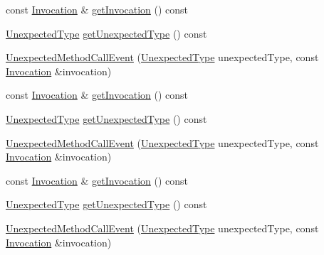 \begin{DoxyCompactItemize}
\item 
const \mbox{\hyperlink{structfakeit_1_1Invocation}{Invocation}} \& \mbox{\hyperlink{structfakeit_1_1UnexpectedMethodCallEvent_a80a3e753a6163cecbb4d6f1b75a03f9f}{get\+Invocation}} () const
\item 
\mbox{\hyperlink{namespacefakeit_ae284671dc00c0fa5ee2aa4a6af02743b}{Unexpected\+Type}} \mbox{\hyperlink{structfakeit_1_1UnexpectedMethodCallEvent_a85b14cb613e543dff7e3c491f643ad7b}{get\+Unexpected\+Type}} () const
\item 
\mbox{\hyperlink{structfakeit_1_1UnexpectedMethodCallEvent_a57007d208f8ad119bbc5fedb744440cc}{Unexpected\+Method\+Call\+Event}} (\mbox{\hyperlink{namespacefakeit_ae284671dc00c0fa5ee2aa4a6af02743b}{Unexpected\+Type}} unexpected\+Type, const \mbox{\hyperlink{structfakeit_1_1Invocation}{Invocation}} \&invocation)
\item 
const \mbox{\hyperlink{structfakeit_1_1Invocation}{Invocation}} \& \mbox{\hyperlink{structfakeit_1_1UnexpectedMethodCallEvent_a80a3e753a6163cecbb4d6f1b75a03f9f}{get\+Invocation}} () const
\item 
\mbox{\hyperlink{namespacefakeit_ae284671dc00c0fa5ee2aa4a6af02743b}{Unexpected\+Type}} \mbox{\hyperlink{structfakeit_1_1UnexpectedMethodCallEvent_a85b14cb613e543dff7e3c491f643ad7b}{get\+Unexpected\+Type}} () const
\item 
\mbox{\hyperlink{structfakeit_1_1UnexpectedMethodCallEvent_a57007d208f8ad119bbc5fedb744440cc}{Unexpected\+Method\+Call\+Event}} (\mbox{\hyperlink{namespacefakeit_ae284671dc00c0fa5ee2aa4a6af02743b}{Unexpected\+Type}} unexpected\+Type, const \mbox{\hyperlink{structfakeit_1_1Invocation}{Invocation}} \&invocation)
\item 
const \mbox{\hyperlink{structfakeit_1_1Invocation}{Invocation}} \& \mbox{\hyperlink{structfakeit_1_1UnexpectedMethodCallEvent_a80a3e753a6163cecbb4d6f1b75a03f9f}{get\+Invocation}} () const
\item 
\mbox{\hyperlink{namespacefakeit_ae284671dc00c0fa5ee2aa4a6af02743b}{Unexpected\+Type}} \mbox{\hyperlink{structfakeit_1_1UnexpectedMethodCallEvent_a85b14cb613e543dff7e3c491f643ad7b}{get\+Unexpected\+Type}} () const
\item 
\mbox{\hyperlink{structfakeit_1_1UnexpectedMethodCallEvent_a57007d208f8ad119bbc5fedb744440cc}{Unexpected\+Method\+Call\+Event}} (\mbox{\hyperlink{namespacefakeit_ae284671dc00c0fa5ee2aa4a6af02743b}{Unexpected\+Type}} unexpected\+Type, const \mbox{\hyperlink{structfakeit_1_1Invocation}{Invocation}} \&invocation)
\item 

\end{DoxyCompactItemize}
